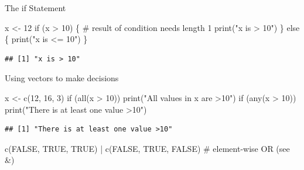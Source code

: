 \documentclass[
  9pt,
  ignorenonframetext,
]{beamer}
\newenvironment{Shaded}{\begin{snugshade}}{\end{snugshade}}
\newcommand{\CommentTok}[1]{\textcolor[rgb]{0.50,0.62,0.50}{#1}}
\newcommand{\ControlFlowTok}[1]{\textcolor[rgb]{0.94,0.87,0.69}{#1}}
\newcommand{\DecValTok}[1]{\textcolor[rgb]{0.86,0.86,0.80}{#1}}
\newcommand{\KeywordTok}[1]{\textcolor[rgb]{0.94,0.87,0.69}{#1}}
\newcommand{\NormalTok}[1]{\textcolor[rgb]{0.80,0.80,0.80}{#1}}
\newcommand{\OperatorTok}[1]{\textcolor[rgb]{0.94,0.94,0.82}{#1}}
\newcommand{\OtherTok}[1]{\textcolor[rgb]{0.94,0.94,0.56}{#1}}
\newcommand{\StringTok}[1]{\textcolor[rgb]{0.80,0.58,0.58}{#1}}
\begin{document}
\begin{frame}[fragile]{The if Statement}
\protect\hypertarget{the-if-statement}{}
\small

\begin{Shaded}
\begin{Highlighting}[]
\NormalTok{x \textless{}{-}}\StringTok{ }\DecValTok{12}
\ControlFlowTok{if}\NormalTok{ (x }\OperatorTok{\textgreater{}}\StringTok{ }\DecValTok{10}\NormalTok{) \{       }\CommentTok{\# result of condition needs length 1}
    \KeywordTok{print}\NormalTok{(}\StringTok{"x is \textgreater{} 10"}\NormalTok{) }
\NormalTok{\} }\ControlFlowTok{else}\NormalTok{ \{ }
    \KeywordTok{print}\NormalTok{(}\StringTok{"x is \textless{}= 10"}\NormalTok{) }
\NormalTok{\}}
\end{Highlighting}
\end{Shaded}

\begin{verbatim}
## [1] "x is > 10"
\end{verbatim}

\vfill

Using vectors to make decisions

\begin{Shaded}
\begin{Highlighting}[]
\NormalTok{x \textless{}{-}}\StringTok{ }\KeywordTok{c}\NormalTok{(}\DecValTok{12}\NormalTok{, }\DecValTok{16}\NormalTok{, }\DecValTok{3}\NormalTok{)}
\ControlFlowTok{if}\NormalTok{ (}\KeywordTok{all}\NormalTok{(x }\OperatorTok{\textgreater{}}\StringTok{ }\DecValTok{10}\NormalTok{)) }\KeywordTok{print}\NormalTok{(}\StringTok{"All values in x are \textgreater{}10"}\NormalTok{)}
\ControlFlowTok{if}\NormalTok{ (}\KeywordTok{any}\NormalTok{(x }\OperatorTok{\textgreater{}}\StringTok{ }\DecValTok{10}\NormalTok{)) }\KeywordTok{print}\NormalTok{(}\StringTok{"There is at least one value \textgreater{}10"}\NormalTok{)   }
\end{Highlighting}
\end{Shaded}

\begin{verbatim}
## [1] "There is at least one value >10"
\end{verbatim}

\begin{Shaded}
\begin{Highlighting}[]
\KeywordTok{c}\NormalTok{(}\OtherTok{FALSE}\NormalTok{, }\OtherTok{TRUE}\NormalTok{, }\OtherTok{TRUE}\NormalTok{) }\OperatorTok{|}\StringTok{  }\KeywordTok{c}\NormalTok{(}\OtherTok{FALSE}\NormalTok{, }\OtherTok{TRUE}\NormalTok{, }\OtherTok{FALSE}\NormalTok{) }\CommentTok{\# element{-}wise OR (see \&)}
\end{Highlighting}
\end{Shaded}


\end{frame}
\end{document}
